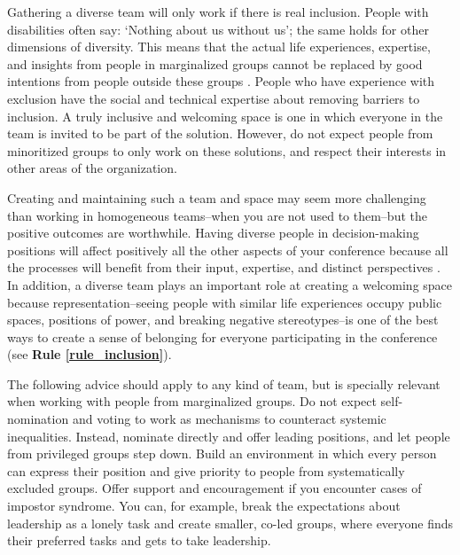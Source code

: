 \documentclass[10pt,letterpaper]{article}
\begin{document}
Gathering a diverse team will only work if there is real inclusion. 
People with disabilities often say: `Nothing about us without us'; the same holds for other dimensions of diversity. 
This means that the actual life experiences, expertise, and insights from people in marginalized groups cannot be replaced by good intentions from people outside these groups \cite{costanzachockDesign2020}.
People who have experience with exclusion have the social and technical expertise about removing barriers to inclusion.
A truly inclusive and welcoming space is one in which everyone in the team is invited to be part of the solution.
However, do not expect people from minoritized groups to only work on these solutions, and respect their interests in other areas of the organization. 

Creating and maintaining such a team and space may seem more challenging than working in homogeneous teams--when you are not used to them--but the positive outcomes are worthwhile. 
Having diverse people in decision-making positions will affect positively all the other aspects of your conference because all the processes will benefit from their input, expertise, and distinct perspectives \cite{hongGroupsDiverseProblem2004}. 
In addition, a diverse team plays an important role at creating a welcoming space because representation--seeing people with similar life experiences occupy public spaces, positions of power, and breaking negative stereotypes--is one of the best ways to create a sense of belonging for everyone participating in the conference (see \textbf{Rule \ref{rule_inclusion}}). 


The following advice should apply to any kind of team, but is specially relevant when working with people from marginalized groups. 
Do not expect self-nomination and voting to work as mechanisms to counteract systemic inequalities. Instead, nominate directly and offer leading positions, and let people from privileged groups step down.
Build an environment in which every person can express their position and give priority to people from systematically excluded groups.
Offer support and encouragement if you encounter cases of impostor syndrome. 
You can, for example, break the expectations about leadership as a lonely task and create smaller, co-led groups, where everyone finds their preferred tasks and gets to take leadership. 
\end{document}
